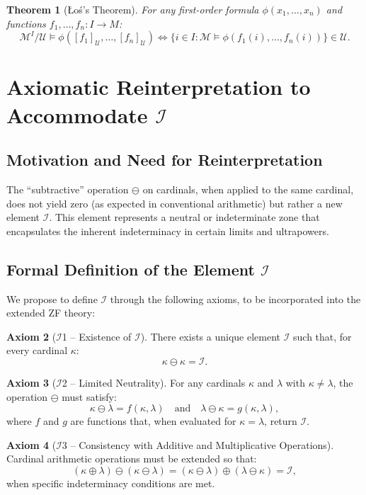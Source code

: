 \documentclass[12pt,a4paper]{article}
\newtheorem{theorem}{Theorem}[section]
\theoremstyle{definition}
\newtheorem{axiom}[theorem]{Axiom}
\theoremstyle{remark}
\begin{document}
\begin{theorem}[Łoś's Theorem]
For any first-order formula $\phi(x_1, \ldots, x_n)$ and functions $f_1, \ldots, f_n : I \to M$:
\[
\mathcal{M}^I/\mathcal{U} \models \phi([f_1]_{\mathcal{U}}, \ldots, [f_n]_{\mathcal{U}}) \iff \{i \in I : \mathcal{M} \models \phi(f_1(i), \ldots, f_n(i))\} \in \mathcal{U}.
\]
\end{theorem}

\section{Axiomatic Reinterpretation to Accommodate $\mathcal{I}$}

\subsection{Motivation and Need for Reinterpretation}

The ``subtractive'' operation $\ominus$ on cardinals, when applied to the same cardinal, does not yield zero (as expected in conventional arithmetic) but rather a new element $\mathcal{I}$. This element represents a neutral or indeterminate zone that encapsulates the inherent indeterminacy in certain limits and ultrapowers.

\subsection{Formal Definition of the Element $\mathcal{I}$}

We propose to define $\mathcal{I}$ through the following axioms, to be incorporated into the extended ZF theory:

\begin{axiom}[$\mathcal{I}$1 -- Existence of $\mathcal{I}$]
There exists a unique element $\mathcal{I}$ such that, for every cardinal $\kappa$:
\[
\kappa \ominus \kappa = \mathcal{I}.
\]
\end{axiom}

\begin{axiom}[$\mathcal{I}$2 -- Limited Neutrality]
For any cardinals $\kappa$ and $\lambda$ with $\kappa \neq \lambda$, the operation $\ominus$ must satisfy:
\[
\kappa \ominus \lambda = f(\kappa, \lambda) \quad \text{and} \quad \lambda \ominus \kappa = g(\kappa, \lambda),
\]
where $f$ and $g$ are functions that, when evaluated for $\kappa = \lambda$, return $\mathcal{I}$.
\end{axiom}

\begin{axiom}[$\mathcal{I}$3 -- Consistency with Additive and Multiplicative Operations]
Cardinal arithmetic operations must be extended so that:
\[
(\kappa \oplus \lambda) \ominus (\kappa \ominus \lambda) = (\kappa \ominus \lambda) \oplus (\lambda \ominus \kappa) = \mathcal{I},
\]
when specific indeterminacy conditions are met.
\end{axiom}
\end{document}
